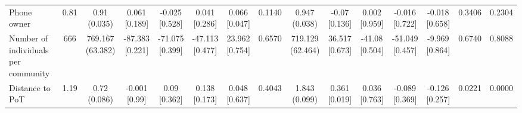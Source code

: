 {\begin{tabular}[t]{lcccccccccccccc}
\hspace{1em}Phone owner & 0.81 & \makecell[c]{0.91\\(0.035)} & \makecell[c]{0.061\\{[0.189]}} & \makecell[c]{-0.025\\{[0.528]}} & \makecell[c]{0.041\\{[0.286]}} & \makecell[c]{0.066\\{[0.047]}} & 0.1140 & \makecell[c]{0.947\\(0.038)} & \makecell[c]{-0.07\\{[0.136]}} & \makecell[c]{0.002\\{[0.959]}} & \makecell[c]{-0.016\\{[0.722]}} & \makecell[c]{-0.018\\{[0.658]}} & 0.3406 & 0.2304\\
\hspace{1em}Number of individuals per community & 666 & \makecell[c]{769.167\\(63.382)} & \makecell[c]{-87.383\\{[0.221]}} & \makecell[c]{-71.075\\{[0.399]}} & \makecell[c]{-47.113\\{[0.477]}} & \makecell[c]{23.962\\{[0.754]}} & 0.6570 & \makecell[c]{719.129\\(62.464)} & \makecell[c]{36.517\\{[0.673]}} & \makecell[c]{-41.08\\{[0.504]}} & \makecell[c]{-51.049\\{[0.457]}} & \makecell[c]{-9.969\\{[0.864]}} & 0.6740 & 0.8088\\
\hspace{1em}Distance to PoT & 1.19 & \makecell[c]{0.72\\(0.086)} & \makecell[c]{-0.001\\{[0.99]}} & \makecell[c]{0.09\\{[0.362]}} & \makecell[c]{0.138\\{[0.173]}} & \makecell[c]{0.048\\{[0.637]}} & 0.4043 & \makecell[c]{1.843\\(0.099)} & \makecell[c]{0.361\\{[0.019]}} & \makecell[c]{0.036\\{[0.763]}} & \makecell[c]{-0.089\\{[0.369]}} & \makecell[c]{-0.126\\{[0.257]}} & 0.0221 & 0.0000\\
\bottomrule
\end{tabular}}

